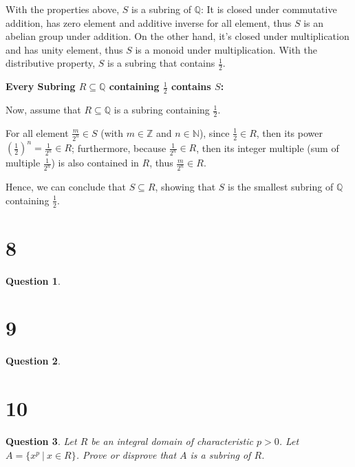 \documentclass{article}
\newtheorem{question}{Question}
\begin{document}
With the properties above, $S$ is a subring of $\mathbb{Q}$:
It is closed under commutative addition, has zero element and additive inverse for all element, thus $S$ is an abelian group under addition.
On the other hand, it's closed under multiplication and has unity element, thus $S$ is a monoid under multiplication.
With the distributive property, $S$ is a subring that contains $\frac{1}{2}$.

\hfill

\textbf{Every Subring $R\subseteq \mathbb{Q}$ containing $\frac{1}{2}$ contains $S$:}

Now, assume that $R\subseteq \mathbb{Q}$ is a subring containing $\frac{1}{2}$.

For all element $\frac{m}{2^n}\in S$ (with $m\in\mathbb{Z}$ and $n\in\mathbb{N}$), since $\frac{1}{2}\in R$, then its power $(\frac{1}{2})^n = \frac{1}{2^n}\in R$;
furthermore, because $\frac{1}{2^n}\in R$, then its integer multiple (sum of multiple $\frac{1}{2^n}$) is also contained in $R$, thus $\frac{m}{2^n}\in R$.

Hence, we can conclude that $S\subseteq R$, showing that $S$ is the smallest subring of $\mathbb{Q}$ containing $\frac{1}{2}$.

\break


\section*{8}
\begin{myBox}[]{}
    \begin{question}
        
    \end{question}
\end{myBox}

\break


\section*{9}
\begin{myBox}[]{}
    \begin{question}
        
    \end{question}
\end{myBox}

\break


\section*{10}
\begin{myBox}[]{}
    \begin{question}
        Let $R$ be an integral domain of characteristic $p > 0$. Let $A = \{x^p\ |\ x\in R\}$. Prove or
        disprove that $A$ is a subring of $R$.
    \end{question}
\end{myBox}
\end{document}
